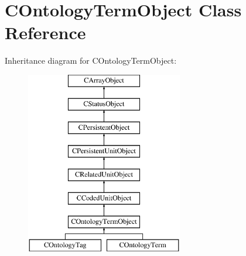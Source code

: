 \hypertarget{class_c_ontology_term_object}{\section{C\-Ontology\-Term\-Object Class Reference}
\label{class_c_ontology_term_object}
}
Inheritance diagram for C\-Ontology\-Term\-Object\-:\begin{figure}[H]
\begin{center}
\leavevmode
\includegraphics[height=8.000000cm]{class_c_ontology_term_object}
\end{center}
\end{figure}
